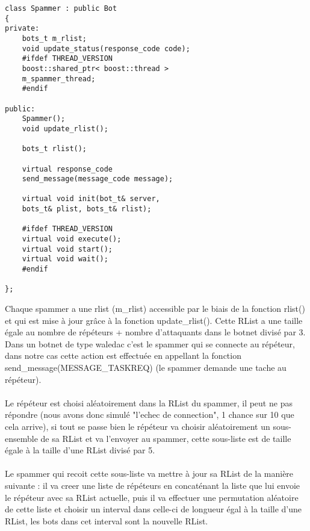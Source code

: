 \documentclass[11pt]{article}
\begin{document}
\begin{minipage}[c]{.46\linewidth}
\begin{verbatim} 
class Spammer : public Bot
{
private:
	bots_t m_rlist;
	void update_status(response_code code);
	#ifdef THREAD_VERSION
	boost::shared_ptr< boost::thread > 
	m_spammer_thread;
	#endif
	
public:
	Spammer();
	void update_rlist();
	
	bots_t rlist();
	
	virtual response_code 
	send_message(message_code message);
	
	virtual void init(bot_t& server, 
	bots_t& plist, bots_t& rlist);
	
	#ifdef THREAD_VERSION
	virtual void execute();
	virtual void start();
	virtual void wait();
	#endif

};
\end{verbatim}	
\end{minipage} \hfill
\begin{minipage}[c]{.46\linewidth}
Chaque spammer a une rlist (m\_rlist) accessible par le biais de la fonction rlist() et qui est mise à jour grâce à la fonction update\_rlist(). Cette RList a une taille égale au nombre de répéteurs + nombre d'attaquants dans le botnet divisé par 3.
Dans un botnet de type waledac c'est le spammer qui se connecte au répéteur, dans notre cas cette action est effectuée en appellant la fonction 
send\_message(MESSAGE\_TASKREQ) (le spammer demande une tache au répéteur).\\\\Le répéteur est choisi aléatoirement dans la RList du spammer, il peut ne pas répondre (nous avons donc 
simulé "l'echec de connection", 1 chance sur 10 que cela arrive), si tout se passe bien le répéteur va choisir aléatoirement un sous-ensemble de sa RList et va l'envoyer au spammer, 
cette sous-liste est de taille égale à la taille d'une RList divisé par 5.\\\\Le spammer qui recoit cette sous-liste va mettre à jour sa RList de la 
manière suivante : il va creer une liste de répéteurs en concaténant la liste que lui envoie le répéteur avec sa RList actuelle, puis il 
va effectuer une permutation aléatoire de cette liste et choisir un interval dans celle-ci de longueur égal à la taille d'une RList, les bots dans 
cet interval sont la nouvelle RList.\\\\
\end{minipage}
\end{document}
